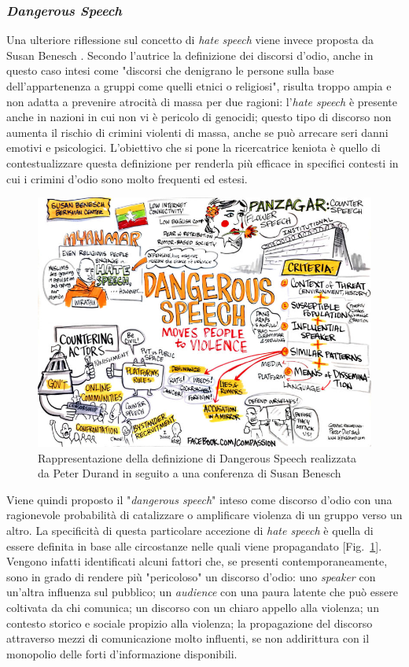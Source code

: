 \subsubsection{\textit{Dangerous Speech}}
Una ulteriore riflessione sul concetto di \textit{hate speech} viene invece proposta da Susan Benesch \citep{benesch2012}. Secondo l'autrice la definizione dei discorsi d'odio, anche in questo caso intesi come "discorsi che denigrano le persone sulla base dell'appartenenza a gruppi come quelli etnici o religiosi", risulta troppo ampia e non adatta a prevenire atrocità di massa per due ragioni: l'\textit{hate speech} è presente anche in nazioni in cui non vi è pericolo di genocidi; questo tipo di discorso non aumenta il rischio di crimini violenti di massa, anche se può arrecare seri danni emotivi e psicologici. L'obiettivo che si pone la ricercatrice keniota è quello di contestualizzare questa definizione per renderla più efficace in specifici contesti in cui i crimini d'odio sono molto frequenti ed estesi.
\begin{figure}
	\includegraphics[width=\textwidth]{figures/dangerousspeech}
	\caption{Rappresentazione della definizione di Dangerous Speech realizzata da Peter Durand in seguito a una conferenza di Susan Benesch}
	\label{dangerousspeech}
\end{figure}

Viene quindi proposto il "\textit{dangerous speech}" inteso come discorso d'odio con una ragionevole probabilità di catalizzare o amplificare violenza di un gruppo verso un altro. La specificità di questa particolare accezione di \textit{hate speech} è quella di essere definita in base alle circostanze nelle quali viene propagandato [Fig.~\ref{dangerousspeech}]. Vengono infatti identificati alcuni fattori che, se presenti contemporaneamente, sono in grado di rendere più "pericoloso" un discorso d'odio: uno \textit{speaker} con un'altra influenza sul pubblico; un \textit{audience} con una paura latente che può essere coltivata da chi comunica; un discorso con un chiaro appello alla violenza; un contesto storico e sociale propizio alla violenza; la propagazione del discorso attraverso mezzi di comunicazione molto influenti, se non addirittura con il monopolio delle forti d'informazione disponibili.


